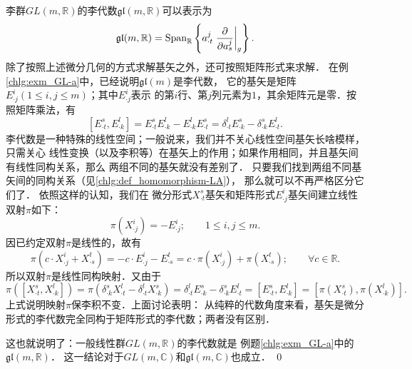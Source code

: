李群$GL(m,\mathbb{R})$的李代数$\mathfrak{gl}(m,\mathbb{R})$可以表示为
\begin{equation}\label{chlg:eqn_GLA-bases}
    \mathfrak{gl}(m,\mathbb{R}) = {\rm Span}_{\mathbb{R}}  \left\{ 
    a^j_{\cdot t} \left.\frac{\partial }{\partial a_{s}^j}\right|_{g} \right\}.
\end{equation}
除了按照上述微分几何的方式求解基矢之外，还可按照矩阵形式来求解．
在例\ref{chlg:exm_GL-a}中，已经说明$\mathfrak{gl}(m)$是李代数，
它的基矢是矩阵$E^i_{\cdot j}(1\leqslant i,j \leqslant m)$；其中$E^i_{\cdot j}$表示
的第$i$行、第$j$列元素为$1$，其余矩阵元是零．按照矩阵乘法，有
\begin{equation}\label{chlg:eqn_GLA-bases-matrix}
    [E_{\cdot t}^s, E_{\cdot k}^l]=E_{\cdot t}^s E_{\cdot k}^l-E_{\cdot k}^lE_{\cdot t}^s
    =\delta^l_{\cdot t} E^s_{\cdot k} -\delta^s_{\cdot k} E^l_{\cdot t}.
\end{equation}
李代数是一种特殊的线性空间；一般说来，我们并不关心线性空间基矢长啥模样，只需关心
线性变换（以及李积等）在基矢上的作用；如果作用相同，并且基矢间有线性同构关系，那么
两组不同的基矢就没有差别了．
只要我们找到两组不同基矢间的同构关系（见\ref{chlg:def_homomorphism-LA}），
那么就可以不再严格区分它们了．
依照这样的认知，我们在
微分形式$X_{\cdot t}^s$基矢和矩阵形式$E^i_{\cdot j}$基矢间建立线性双射$\pi$如下：
\begin{equation}
    \pi(X_{\cdot j}^i) = -E^i_{\cdot j} ; \qquad 1\leqslant i,j \leqslant m.
\end{equation}
因已约定双射$\pi$是线性的，故有
\begin{equation}
    \pi(c\cdot X_{\cdot j}^i+X_{\cdot s}^t) =- c\cdot E^i_{\cdot j} - E_{\cdot s}^t
    = c\cdot \pi (X^i_{\cdot j}) + \pi(X_{\cdot s}^t) ;    \qquad \forall c\in \mathbb{R}.
\end{equation}
所以双射$\pi$是线性同构映射．又由于
\begin{equation*}
    \pi\left([X_{\cdot t}^s, X_{\cdot k}^l]\right)
    = \pi\left(\delta^s_{\cdot k} X^l_{\cdot t} -\delta^l_{\cdot t} X^s_{\cdot k} \right)
    =\delta^l_{\cdot t} E^s_{\cdot k}-\delta^s_{\cdot k} E^l_{\cdot t}
    =[E_{\cdot t}^s, E_{\cdot k}^l] 
    =\left[\pi(X_{\cdot t}^s), \pi(X_{\cdot k}^l)\right] .
\end{equation*}
上式说明映射$\pi$保李积不变．上面讨论表明：
从纯粹的代数角度来看，基矢是微分形式的李代数完全同构于矩阵形式的李代数；两者没有区别．


这也就说明了：一般线性群$GL(m,\mathbb{R})$的李代数就是
例题\ref{chlg:exm_GL-a}中的$\mathfrak{gl}(m,\mathbb{R})$．
这一结论对于$GL(m,\mathbb{C})$和$\mathfrak{gl}(m,\mathbb{C})$也成立．
\qed

